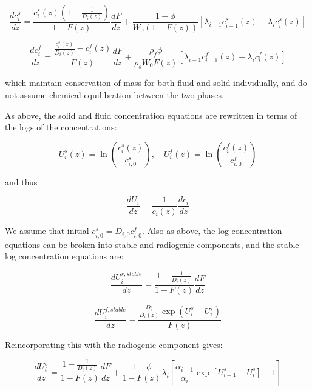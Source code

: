 \documentclass[11pt]{article}
\begin{document}
\begin{equation}
    \frac{dc_i^s}{dz} = \frac{c_i^s(z) (1 - \frac{1}{D_i(z)})}{1-F(z)} \frac{dF}{dz} + \frac{1-\phi}{W_0(1-F(z))} [\lambda_{i-1} c_{i-1}^s(z) - \lambda_i c_i^s(z)]\label{eq:21}
\end{equation}

\begin{equation}
    \frac{dc_i^f}{dz} = \frac{\frac{c_i^s(z)}{D_i(z)}-c_i^f(z)}{F(z)} \frac{dF}{dz} + \frac{\rho_f \phi}{\rho_s W_0 F(z)} [\lambda_{i-1} c_{i-1}^f(z) - \lambda_i c_i^f(z)]\label{eq:22}
\end{equation}

which maintain conservation of mass for both fluid and solid individually, and do not assume chemical equilibration between the two phases.

As above, the solid and fluid concentration equations are rewritten in terms of the logs of the concentrations:

\begin{equation}
    U^s_i(z) = \ln\left(\frac{c_i^{s}(z)}{c_{i,0}^s}\right),  \quad U^f_i(z) = \ln\left(\frac{c_i^{f}(z)}{c_{i,0}^f}\right)\label{eq:23}
\end{equation}

and thus

\begin{equation}
    \frac{dU_i}{dz} = \frac{1}{c_i(z)} \frac{dc_i}{dz}\label{eq:24}
\end{equation}

We assume that initial $c_{i,0}^s = D_{i,0} c_{i,0}^f$. Also as above, the log concentration equations can be broken into stable and radiogenic components, and the stable log concentration equations are:

\begin{equation}
    \frac{dU_{i}^{s,stable}}{dz} = \frac{1-\frac{1}{D_i(z)}}{1-F(z)} \frac{dF}{dz}\label{eq:25}
\end{equation}

\begin{equation}
    \frac{dU_{i}^{f,stable}}{dz} = \frac{\frac{D_i^0}{D_i(z)} \exp(U_i^s-U_i^f)}{F(z)}\label{eq:26}
\end{equation}

Reincorporating this with the radiogenic component gives:

\begin{equation}
    \frac{dU_{i}^{s}}{dz} = \frac{1-\frac{1}{D_i(z)}}{1-F(z)} \frac{dF}{dz} + \frac{1-\phi}{1-F(z)}\lambda_i \left[\frac{\alpha_{i-1}}{\alpha_i} \exp[U_{i-1}^s - U_i^s]-1\right]\label{eq:27}
\end{equation}
\end{document}
